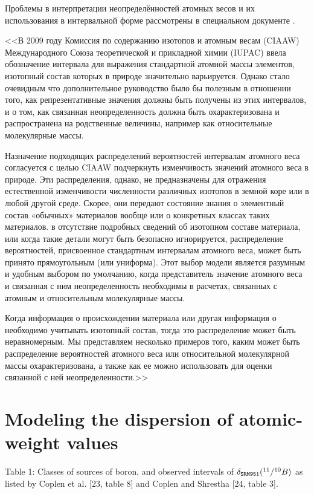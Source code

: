 \documentclass[a5paper,openany]{book}
\begin{document}
Проблемы в интерпретации неопределённостей атомных весов и их использования в интервальной форме рассмотрены в специальном документе \cite{IUPACUncertainty}. 

<<В 2009 году Комиссия по содержанию изотопов и атомным весам (CIAAW) Международного
Союза теоретической и прикладной химии (IUPAC) ввела обозначение интервала для выражения стандартной атомной
массы элементов, изотопный состав которых в природе значительно варьируется. Однако стало очевидным
что дополнительное руководство было бы полезным в отношении того, как репрезентативные значения должны быть получены из этих интервалов,
и о том, как связанная неопределенность должна быть охарактеризована и распространена на родственные величины, например
как относительные молекулярные массы. 

Назначение подходящих распределений вероятностей интервалам атомного веса
согласуется с целью CIAAW подчеркнуть изменчивость значений атомного веса в природе.
Эти распределения, однако, не предназначены для отражения естественной изменчивости численности различных
изотопов в земной коре или в любой другой среде. Скорее, они передают состояние знания о
элементный состав «обычных» материалов вообще или о конкретных классах таких материалов. в
отсутствие подробных сведений об изотопном составе материала, или когда такие детали могут быть безопасно
игнорируется, распределение вероятностей, присвоенное стандартным интервалам атомного веса, может быть принято прямоугольным
(или униформа). Этот выбор модели является разумным и удобным выбором по умолчанию, когда представитель
значение атомного веса и связанная с ним неопределенность необходимы в расчетах, связанных с атомным и относительным
молекулярные массы. 

Когда информация о происхождении материала или другая информация о
необходимо учитывать изотопный состав, тогда это распределение может быть неравномерным. Мы представляем
несколько примеров того, каким может быть распределение вероятностей атомного веса или относительной молекулярной массы охарактеризована, а также как ее можно использовать для оценки связанной с ней неопределенности.>>

\section{Modeling the dispersion of atomic-weight values}

Table 1: Classes of sources of boron, and observed intervals of $\delta_{\tt SRM951}(^{11}/^{10}B)$ as listed by Coplen et al. [23, table 8] and Coplen and Shrestha [24, table 3].
\end{document}
